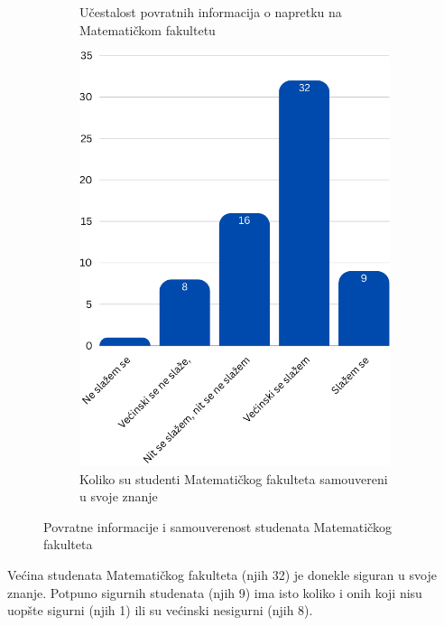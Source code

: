 \documentclass[a4paper]{article}
\begin{document}
{\begin{figure}[h!]
\begin{center}
{\begin{subfigure}[b]{0.45\textwidth}
            \vspace{50pt}
            \caption{Učestalost povratnih informacija o napretku na Matematičkom fakultetu}
            \label{fig:povratne_informacije_matf}
        \end{subfigure}
    }
    \hfill
    \begin{subfigure}[b]{0.45\textwidth}
        \includegraphics[width=\textwidth]{SamouverenostStudenataMatf.png}
        \caption{Koliko su studenti Matematičkog fakulteta samouvereni u svoje znanje}
        \label{fig:samouverenost_matf}
    \end{subfigure}
    \caption{Povratne informacije i samouverenost studenata Matematičkog fakulteta}
    \label{fig:combined_matf}
\end{center}
\end{figure}

Većina studenata Matematičkog fakulteta (njih 32) je donekle siguran u svoje znanje. Potpuno sigurnih studenata (njih 9) ima isto koliko i onih koji nisu uopšte sigurni (njih 1) ili su većinski nesigurni (njih 8).

}
\end{document}
